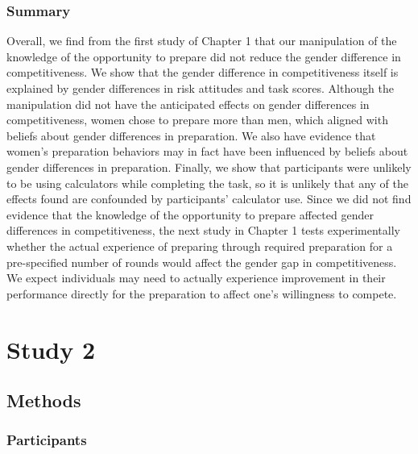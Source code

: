 \documentclass[letterpaper, nobind]{templates/ociamthesis}
\begin{document}
\hypertarget{summary}{%
\subsubsection{Summary}\label{summary}}

Overall, we find from the first study of Chapter 1 that our manipulation of the knowledge of the opportunity to prepare did not reduce the gender difference in competitiveness. We show that the gender difference in competitiveness itself is explained by gender differences in risk attitudes and task scores. Although the manipulation did not have the anticipated effects on gender differences in competitiveness, women chose to prepare more than men, which aligned with beliefs about gender differences in preparation. We also have evidence that women's preparation behaviors may in fact have been influenced by beliefs about gender differences in preparation. Finally, we show that participants were unlikely to be using calculators while completing the task, so it is unlikely that any of the effects found are confounded by participants' calculator use. Since we did not find evidence that the knowledge of the opportunity to prepare affected gender differences in competitiveness, the next study in Chapter 1 tests experimentally whether the actual experience of preparing through required preparation for a pre-specified number of rounds would affect the gender gap in competitiveness. We expect individuals may need to actually experience improvement in their performance directly for the preparation to affect one's willingness to compete.

\hypertarget{study-2}{%
\section{Study 2}\label{study-2}}

\hypertarget{methods-1}{%
\subsection{Methods}\label{methods-1}}

\hypertarget{participants-1}{%
\subsubsection{Participants}\label{participants-1}}
\end{document}
